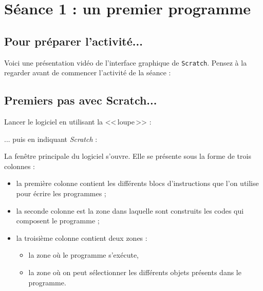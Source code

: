 %
%
%
%

\section{Séance 1 : un premier programme}

\subsection{Pour préparer l'activité...}

Voici une présentation vidéo de l'interface graphique de \texttt{Scratch}. Pensez à la regarder avant de commencer l'activité de la séance :

\begin{center}
\end{center}




\subsection{Premiers pas avec Scratch...}

Lancer le logiciel en utilisant la <<\,loupe\,>> :


... puis en indiquant \emph{Scratch} :



La fenêtre principale du logiciel s'ouvre. Elle se présente sous la forme de trois colonnes :

\begin{itemize}
\item la première colonne  contient les différents blocs d'instructions que l'on utilise pour écrire les programmes ;
\item la seconde colonne  est la zone dans laquelle sont construits les codes qui composent le programme ;
\item la troisième colonne  contient deux zones :
        \begin{itemize}
        \item la zone où le programme s'exécute,
        \item la zone où on peut sélectionner les différents objets présents dans le programme.
        \end{itemize}
\end{itemize}

